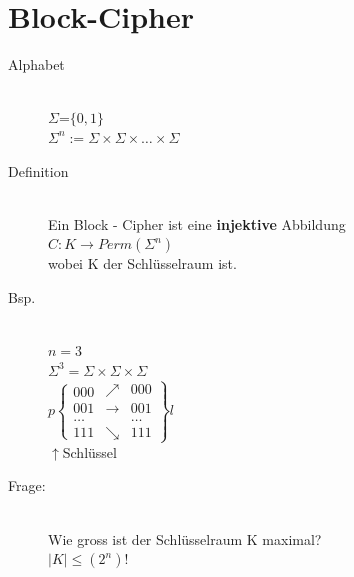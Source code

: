 \documentclass[10pt]{article}
\newcommand{\ra}{\rightarrow}
\newcommand{\Brackal}[2]{\left\lbrace\begin{array}{#1} #2 \end{array}\right.} %
\newcommand{\Brackar}[2]{\left.\begin{array}{#1} #2 \end{array}\right\rbrace} %
\begin{document}
\section{Block-Cipher}
\begin{description}
	\item[Alphabet] \hfill \\
		$\Sigma$=$\{0,1\}$ \\
		$\Sigma^n := \Sigma \times \Sigma \times \dots \times \Sigma$ 
	\item[Definition] \hfill \\
		Ein Block - Cipher ist eine \textbf{injektive} Abbildung \\
		$C: K \ra Perm(\Sigma^n)$ \\
		wobei K der Schlüsselraum ist.
	\item[Bsp.] \hfill \\
		$n=3$ \\
		$\Sigma^3=\Sigma\times\Sigma\times\Sigma$\\
$p\Brackal{c}{000\\001\\\dots\\111}\Brackar{cc}{\nearrow&000\\\to&001\\&\dots\\\searrow&111}l$\\
\hspace*{1.8cm}$\uparrow$Schlüssel\\
	\item[Frage:] \hfill \\
		Wie gross ist der Schlüsselraum K maximal? \\
		$|K| \leq (2^n)!$
\end{description}
\end{document}
